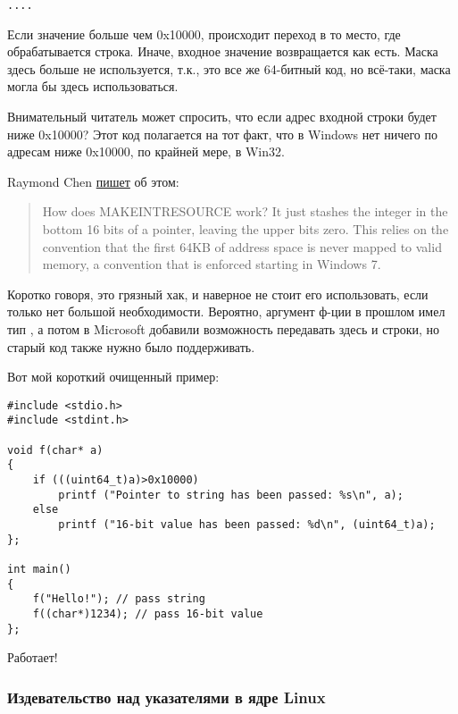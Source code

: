 \begin{lstlisting}[style=customasmx86]
....

\end{lstlisting}

Если значение больше чем 0x10000, происходит переход в то место, где обрабатывается строка.
Иначе, входное значение  возвращается как есть.
Маска  здесь больше не используется, т.к., это все же 64-битный код, но всё-таки,
маска  могла бы здесь использоваться.

Внимательный читатель может спросить, что если адрес входной строки будет ниже 0x10000?
Этот код полагается на тот факт, что в Windows нет ничего по адресам ниже 0x10000, по крайней мере, в Win32.

Raymond Chen \href{https://blogs.msdn.microsoft.com/oldnewthing/20130925-00/?p=3123}{пишет} об этом:

\begin{framed}
\begin{quotation}
How does MAKE­INT­RESOURCE work? It just stashes the integer in the bottom 16 bits of a pointer, leaving the upper bits zero. This relies on the convention that the first 64KB of address space is never mapped to valid memory, a convention that is enforced starting in Windows 7.
\end{quotation}
\end{framed}

Коротко говоря, это грязный хак, и наверное не стоит его использовать, если только нет большой необходимости.
Вероятно, аргумент ф-ции  в прошлом имел тип , а потом в Microsoft добавили возможность
передавать здесь и строки, но старый код также нужно было поддерживать.

Вот мой короткий очищенный пример:

\begin{lstlisting}[style=customc]
#include <stdio.h>
#include <stdint.h>

void f(char* a)
{
	if (((uint64_t)a)>0x10000)
		printf ("Pointer to string has been passed: %s\n", a);
	else
		printf ("16-bit value has been passed: %d\n", (uint64_t)a);
};

int main()
{
	f("Hello!"); // pass string
	f((char*)1234); // pass 16-bit value
};
\end{lstlisting}

Работает!

\subsubsection{Издевательство над указателями в ядре Linux}

